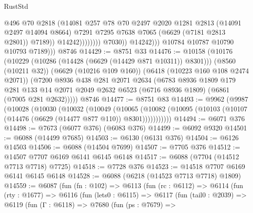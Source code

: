 \begin{lexlean}{RustStd}
\begin{coremodule}
                                      @496
                                      @70
                                      @2818
                                      (@14081
                                        @257
                                        @78
                                        @70
                                        @2497
                                        @2020
                                        @1281
                                        @2813
                                        (@14091 @2497 @14094 @8664)
                                        @7291
                                        @7295
                                        @7638
                                        @7065
                                        (@6629 (@7181 @2813 @2801))
                                        @7189))
                                    @14242))))))))
                    @7030))
                @14242)))
          @10784
          @10787
          @10790
          @10793
          @7189)))
    @8746
@14429 := @8751 @33
@14476 := @10158
    (@10176
      (@10229 (@10286 (@14428 (@6629 (@14429 @871 @10311)) @8301)))
      (@8560 (@10211 @32))
      (@6629 (@10216 @109 @160))
      (@6418 (@10223 @160 @108 @2474 @2071))
      (@7200
        @8936
        @438
        @281
        @2071
        @2634
        (@6783
          @8936
          @1809
          @179
          @281
          @133
          @14
          @2071
          @2049
          @2632
          @6523
          (@6716 @8936 @1809)
          (@6861 (@7005 @281 @2632)))))
    @8746
@14477 := @8751 @83
@14493 := @9962
    (@9987
      (@10028
        (@10030
          (@10032
            (@10049
              (@10065
                (@10082 (@10095 (@10103 (@10107 (@14476 (@6629 (@14477 @877 @110)) @8301)))))))))))
@14494 := @6071 @376
@14498 := @7673 (@6077 @376) (@6083 @376)
@14499 := @6092 @9320
@14501 := @6088 (@14499 @7685)
@14503 := @6130 (@6131 @376)
@14504 := @6126 @14503
@14506 := @6088 (@14504 @7699)
@14507 := @7705 @376
@14512 := @14507 @7707 @6169 @6141 @6145 @6148
@14517 := @6088 (@7704 (@14512 @7713 @7718) @7725)
@14518 := @7728 @376
@14523 := @14518 @7707 @6169 @6141 @6145 @6148
@14528 := @6088 (@6218 (@14523 @7713 @7718) @1809)
@14559 := @6087
    (fun (fn : @102) =>
    @6113
      (fun (rc : @6112) =>
      @6114
        (fun (rty : @1677) =>
        @6116
          (fun (lets0 : @6115) =>
          @6117
            (fun (tail0 : @2039) =>
            @6119
              (fun (Γ : @6118) =>
              @7680
                (fun (ps : @7679) =>

\end{coremodule}
\end{lexlean}
